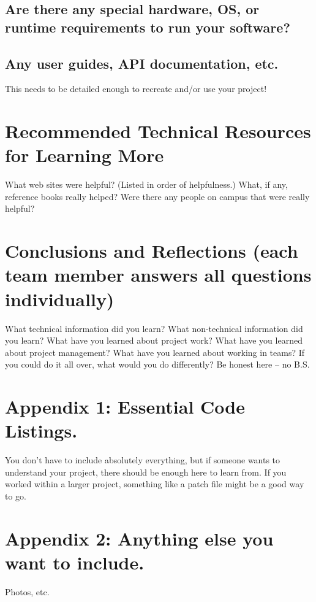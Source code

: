\documentclass[journal,10pt,onecolumn,compsoc]{IEEEtran}
\begin{document}
\subsection{Are there any special hardware, OS, or runtime requirements to run your software?}
\subsection{Any user guides, API documentation, etc.}
This needs to be detailed enough to recreate and/or use your project!
\section{Recommended Technical Resources for Learning More}
What web sites were helpful? (Listed in order of helpfulness.)
What, if any, reference books really helped?
Were there any people on campus that were really helpful?
\section{Conclusions and Reflections (each team member answers all questions individually)}
What technical information did you learn?
What non-technical information did you learn?
What have you learned about project work?
What have you learned about project management?
What have you learned about working in teams?
If you could do it all over, what would you do differently?
Be honest here -- no B.S.

\section{Appendix 1: Essential Code Listings.}
You don't have to include absolutely everything, but if someone wants to understand your project, there should be enough here to learn from. If you worked within a larger project, something like a patch file might be a good way to go.
\section{Appendix 2: Anything else you want to include.}
Photos, etc.

\end{document}

